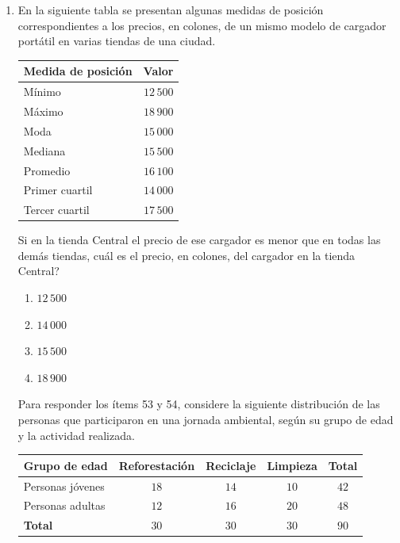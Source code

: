 \documentclass[12pt]{article}
\newcommand{\opcion}[2]{\item $#2$}
\begin{document}
\begin{enumerate}[label=\textbf{\arabic*.}, start=29, itemsep=1cm]
\Needspace{0.58\textheight}
\item
En la siguiente tabla se presentan algunas medidas de posici\'on correspondientes a los precios, en colones, de un mismo modelo de cargador port\'atil en varias tiendas de una ciudad.

\begin{center}
\renewcommand{\arraystretch}{1.25}
\begin{tabular}{|l|r|}
\hline
\textbf{Medida de posici\'on} & \textbf{Valor} \\ \hline
M\'inimo         & $12\,500$ \\ \hline
M\'aximo         & $18\,900$ \\ \hline
Moda             & $15\,000$ \\ \hline
Mediana          & $15\,500$ \\ \hline
Promedio         & $16\,100$ \\ \hline
Primer cuartil   & $14\,000$ \\ \hline
Tercer cuartil   & $17\,500$ \\ \hline
\end{tabular}
\end{center}

Si en la tienda Central el precio de ese cargador es menor que en todas las dem\'as tiendas, \textquestiondown cu\'al es el precio, en colones, del cargador en la tienda Central?

\begin{enumerate}[label=\Alph*)]
  \opcion{A}{12\,500}
  \opcion{B}{14\,000}
  \opcion{C}{15\,500}
  \opcion{D}{18\,900}
\end{enumerate}

\Needspace{0.92\textheight}
\noindent Para responder los \'items 53 y 54, considere la siguiente distribuci\'on de las personas que participaron en una jornada ambiental, seg\'un su grupo de edad y la actividad realizada.

\begin{center}
\begingroup
\small
\renewcommand{\arraystretch}{1.35}
\begin{tabular}{|l|c|c|c|c|}
\hline
\textbf{Grupo de edad} & \textbf{Reforestaci\'on} & \textbf{Reciclaje} & \textbf{Limpieza} & \textbf{Total} \\ \hline
Personas j\'ovenes & $18$ & $14$ & $10$ & $42$ \\ \hline
Personas adultas  & $12$ & $16$ & $20$ & $48$ \\ \hline
\textbf{Total}    & $30$ & $30$ & $30$ & $90$ \\ \hline
\end{tabular}
\endgroup
\end{center}


\end{enumerate}
\end{document}
